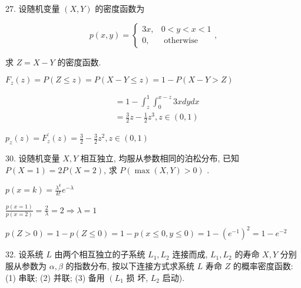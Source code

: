 \documentclass[14pt]{scrartcl} %
\numberwithin{equation}{section} %
\numberwithin{figure}{section} %
\numberwithin{table}{section} %
\begin{document}
	27. 设随机变量 $(X, Y)$ 的密度函数为
	
	$$
	p(x, y)=\left\{\begin{array}{cc}
		3 x, & 0<y<x<1 \\
		0, & \text { otherwise }
	\end{array},\right.
	$$
	
	求 $Z=X-Y$ 的密度函数.
	
	$F_{z}(z)=P(Z \leqslant z)=P(X - Y \leqslant z)=1-P(X-Y>Z)$
	
	$$
	\begin{aligned}
		& =1-\int_{z}^{1} \int_{0}^{x-z} 3 x d y d x \\
		& =\frac{3}{2} z-\frac{1}{2} z^{3}, z \in(0,1)
	\end{aligned}
	$$
	
	$p_{z}(z)=F_{z}^{\prime}(z)=\frac{3}{2}-\frac{3}{2} z^{2}, z \in(0,1)$
	
	30. 设随机变量 $X, Y$ 相互独立, 均服从参数相同的泊松分布, 已知 $P(X=1)=2 P(X=2)$, 求 $P(\max (X, Y)>0)$ .
	
	$p(x=k)=\frac{\lambda^{k}}{k !} e^{-\lambda}$
	
	$
	\frac{p(x=1)}{p(x=2)}=\frac{2}{\lambda}=2 \Rightarrow \lambda=1
	$
	
	$p(Z>0)=1-p(Z \leq 0)=1-p(x \leq 0, y \leq 0)=1-\left(e^{-1}\right)^{2}=1 - e^{-2}$

32. 设系统 $L$ 由两个相互独立的子系统 $L_{1}, L_{2}$ 连接而成, $L_{1}, L_{2}$ 的寿命 $X, Y$ 分别服从参数为 $\alpha, \beta$ 的指数分布, 按以下连接方式求系统 $L$ 寿命 $Z$ 的概率密度函数: (1) 串联; (2) 并联; (3) 备用 $\left(L_{1}\right.$ 损 坏, $L_{2}$ 启动).
\end{document}
